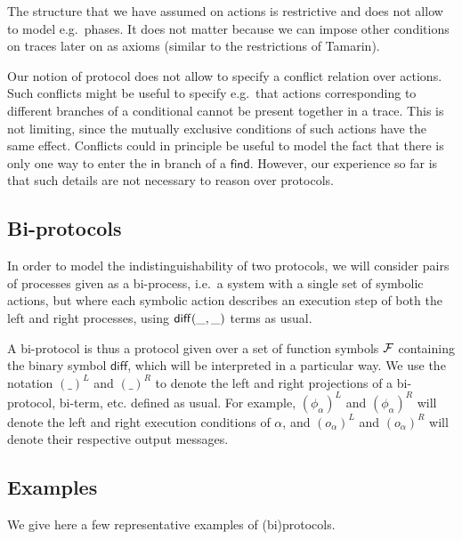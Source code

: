 \begin{remark}
  The structure that we have assumed on actions is restrictive and
  does not allow to model e.g.\ phases. It does not matter because we can
  impose other conditions on traces later on as axioms (similar to the
  restrictions of Tamarin).
\end{remark}

\begin{remark}
  Our notion of protocol does not allow to specify a conflict relation
  over actions. Such conflicts might be useful to specify e.g.\ that
  actions corresponding to different branches of a conditional cannot
  be present together in a trace. This is not limiting, since the
  mutually exclusive conditions of such actions have the same effect.
  Conflicts could in principle be useful to model the fact that there is only 
  one way to enter the $\mathsf{in}$ branch of a $\mathsf{find}$. However,
  our experience so far is that such details are not necessary to reason
  over protocols.
\end{remark}

\subsection{Bi-protocols}

In order to model the indistinguishability of two protocols, we will
consider pairs of processes given as a bi-process, i.e.\ a system with
a single set of symbolic actions, but where each symbolic action describes
an execution step of both the left and right processes,
using $\mathsf{diff}(\_,\_)$ terms as usual.

A bi-protocol is thus a protocol given over a set of function symbols
$\mathcal{F}$ containing the binary symbol $\mathsf{diff}$,
which will be interpreted in a particular way.
We use the notation $(\_)^L$ and $(\_)^R$ to denote the left and right 
projections of a bi-protocol, bi-term, etc. defined as usual.
For example, $(\phi_{\alpha})^L$ and $(\phi_{\alpha})^R$ will denote
the left and right execution conditions of $\alpha$, and
$(o_{\alpha})^L$ and $(o_{\alpha})^R$ will denote their respective
output messages.

\subsection{Examples}

We give here a few representative examples of (bi)protocols.

